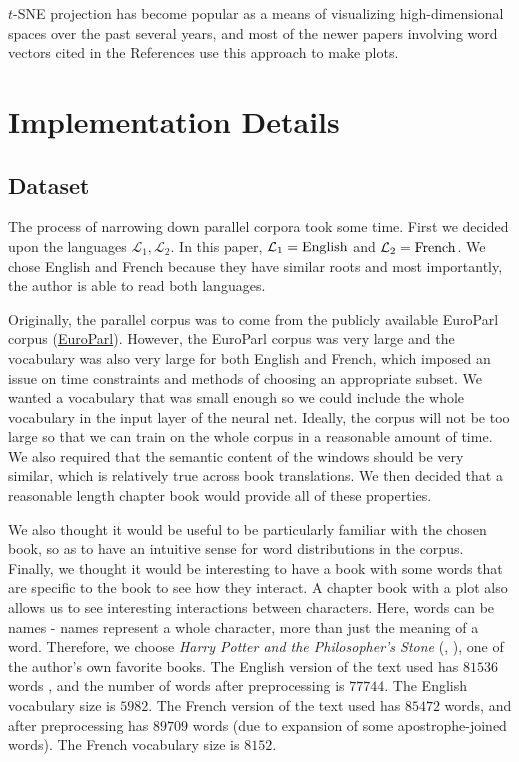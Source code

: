 \documentclass[12pt, usenames]{article}
\theoremstyle{definition}
\theoremstyle{definition}
\theoremstyle{definition}
\newcommand{\txt}[1]
{\textnormal{#1}}
\newcommand{\mc}[1]
{\mathcal{#1}}
\begin{document}
$t$-SNE projection has become popular as a means of visualizing high-dimensional spaces over the past several years, and most of the newer papers involving word vectors cited in the References use this approach to make plots. 


\section{Implementation Details}

\subsection{Dataset}

The process of narrowing down parallel corpora took some time. First we decided upon the languages $\mc{L}_1, \mc{L}_2$. In this paper, $\mc{L}_1 = \txt{English}$ and $\mc{L}_2 = \txt{French}$. 
We chose English and French because they have similar roots and most importantly, the author is able to read both languages. 

Originally, the parallel corpus was to come from the publicly available EuroParl corpus (\href{http://www.europarl.europa.eu/}{EuroParl}). However, the EuroParl corpus was very large and the vocabulary was also very large for both English and French, which imposed an issue on time constraints and methods of choosing an appropriate subset. We wanted a vocabulary that was small enough so we could include the whole vocabulary in the input layer of the neural net. Ideally, the corpus will not be too large so that we can train on the whole corpus in a reasonable amount of time. We also required that the semantic content of the windows should be very similar, which is relatively true across book translations. We then decided that a reasonable length chapter book would provide all of these properties. 

We also thought it would be useful to be particularly familiar with the chosen book, so as to have an intuitive sense for word distributions in the corpus. Finally, we thought it would be interesting to have a book with some words that are specific to the book to see how they interact. A chapter book with a plot also allows us to see interesting interactions between characters. Here, words can be names - names represent a whole character, more than just the meaning of a word.
Therefore, we choose \textit{Harry Potter and the Philosopher's Stone} (\cite{RowlingEn}, \cite{RowlingFr}), one of the author's own favorite books. The English version of the text used has $81536$ words , and the number of words after preprocessing is $77744$. The English vocabulary size is $5982$. The French version of the text used has $85472$ words, and after preprocessing has $89709$ words (due to expansion of some apostrophe-joined words). The French vocabulary size is $8152$.
\end{document}
